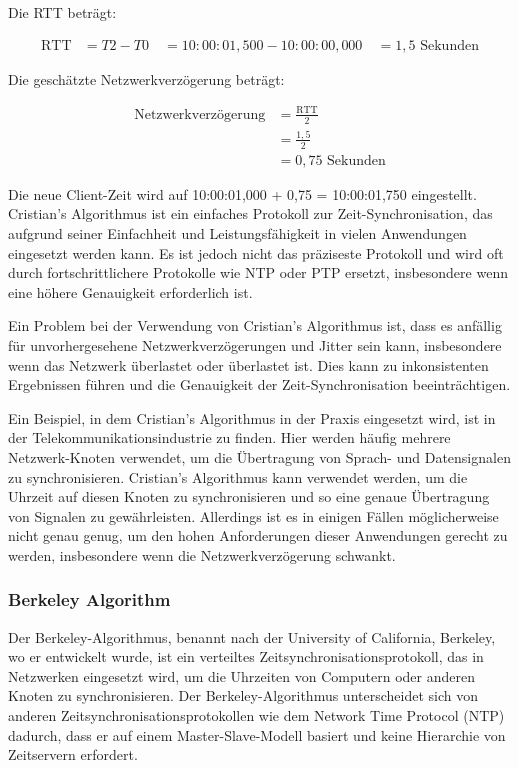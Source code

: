Die RTT beträgt:

\begin{align*}
\text{RTT} &= T2 - T0 \
&= 10:00:01,500 - 10:00:00,000 \
&= 1,5\text{ Sekunden}
\end{align*}

Die geschätzte Netzwerkverzögerung beträgt:

\begin{align*}
\text{Netzwerkverzögerung} &= \frac{\text{RTT}}{2} \\
&= \frac{1,5}{2} \\
&= 0,75\text{ Sekunden}
\end{align*}

Die neue Client-Zeit wird auf 10:00:01,000 + 0,75 = 10:00:01,750 eingestellt.
Cristian's Algorithmus ist ein einfaches Protokoll zur Zeit-Synchronisation, das aufgrund seiner Einfachheit und Leistungsfähigkeit in vielen Anwendungen eingesetzt werden kann. Es ist jedoch nicht das präziseste Protokoll und wird oft durch fortschrittlichere Protokolle wie NTP oder PTP ersetzt, insbesondere wenn eine höhere Genauigkeit erforderlich ist.

Ein Problem bei der Verwendung von Cristian's Algorithmus ist, dass es anfällig für unvorhergesehene Netzwerkverzögerungen und Jitter sein kann, insbesondere wenn das Netzwerk überlastet oder überlastet ist. Dies kann zu inkonsistenten Ergebnissen führen und die Genauigkeit der Zeit-Synchronisation beeinträchtigen.

Ein Beispiel, in dem Cristian's Algorithmus in der Praxis eingesetzt wird, ist in der Telekommunikationsindustrie zu finden. Hier werden häufig mehrere Netzwerk-Knoten verwendet, um die Übertragung von Sprach- und Datensignalen zu synchronisieren. Cristian's Algorithmus kann verwendet werden, um die Uhrzeit auf diesen Knoten zu synchronisieren und so eine genaue Übertragung von Signalen zu gewährleisten. Allerdings ist es in einigen Fällen möglicherweise nicht genau genug, um den hohen Anforderungen dieser Anwendungen gerecht zu werden, insbesondere wenn die Netzwerkverzögerung schwankt.

\subsubsection{Berkeley Algorithm}

Der Berkeley-Algorithmus, benannt nach der University of California, Berkeley, wo er entwickelt wurde, ist ein verteiltes Zeitsynchronisationsprotokoll, das in Netzwerken eingesetzt wird, um die Uhrzeiten von Computern oder anderen Knoten zu synchronisieren.  Der Berkeley-Algorithmus unterscheidet sich von anderen Zeitsynchronisationsprotokollen wie dem Network Time Protocol (NTP) dadurch, dass er auf einem Master-Slave-Modell basiert und keine Hierarchie von Zeitservern erfordert.

